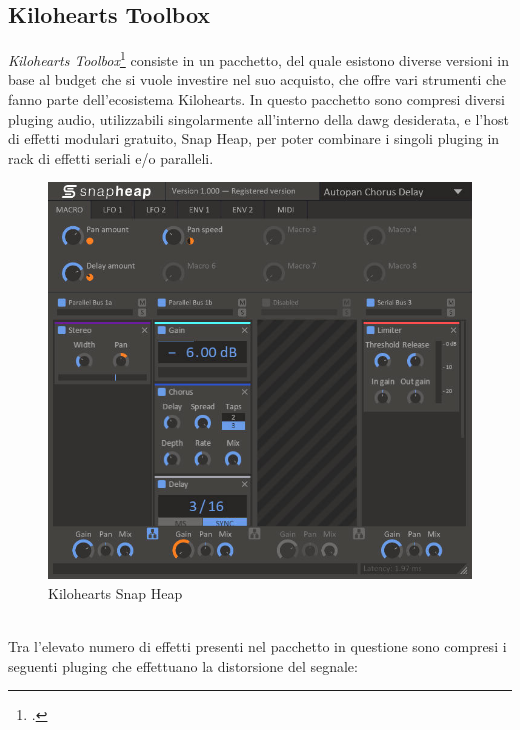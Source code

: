 \subsection*{Kilohearts Toolbox}
\noindent \textit{Kilohearts Toolbox}\footcite{site:toolbox} consiste in un pacchetto, del quale esistono diverse versioni in base al budget che si vuole investire nel suo acquisto, che offre vari strumenti che fanno parte dell'ecosistema Kilohearts. In questo pacchetto sono compresi diversi \gls{pluging} audio, utilizzabili singolarmente all'interno della \gls{dawg} desiderata, e l'host di effetti modulari gratuito, Snap Heap, per poter combinare i singoli \gls{pluging} in rack di effetti seriali e/o paralleli. \\
\begin{figure}[!h] 
    \centering 
    \includegraphics[width=0.8\columnwidth]{immagini/cap2/kilohearts.jpg}
    \caption{Kilohearts Snap Heap}
\end{figure} \\
Tra l'elevato numero di effetti presenti nel pacchetto in questione sono compresi i seguenti \gls{pluging} che effettuano la distorsione del segnale:
